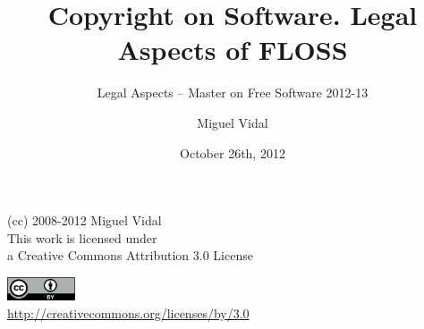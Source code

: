 \documentclass{beamer}
\begin{document}
\title{Copyright on Software. Legal Aspects of FLOSS}
\subtitle{Legal Aspects -- Master on Free Software 2012-13}
\author{Miguel Vidal} 
\date{October 26th, 2012}



\begin{frame}
  \vspace{2cm}
  \begin{flushright}
    {\small (cc) 2008-2012 Miguel Vidal} \\
    \medskip
    {\scriptsize This work is licensed under \\ a Creative Commons Attribution 3.0 License}
  \end{flushright}
  \begin{flushright}
    \href{http://creativecommons.org/licenses/by/3.0}{\includegraphics[width=2cm]{format/cc-by.png}} \\
    {\tiny \url{http://creativecommons.org/licenses/by/3.0}}
  \end{flushright}
\end{frame}%

\usebackgroundtemplate{}

\end{document}
